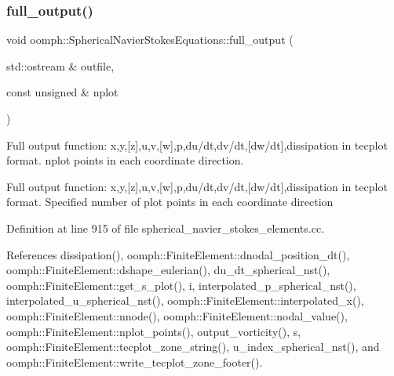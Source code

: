 \mbox{\label{classoomph_1_1SphericalNavierStokesEquations_a444d7347a79629db8e59c1267b97f201}} 
\subsubsection{\texorpdfstring{full\+\_\+output()}{full\_output()}\hspace{0.1cm}{\footnotesize\ttfamily [2/2]}}
{\footnotesize\ttfamily void oomph\+::\+Spherical\+Navier\+Stokes\+Equations\+::full\+\_\+output (\begin{DoxyParamCaption}\item[{std\+::ostream \&}]{outfile,  }\item[{const unsigned \&}]{nplot }\end{DoxyParamCaption})}



Full output function\+: x,y,\mbox{[}z\mbox{]},u,v,\mbox{[}w\mbox{]},p,du/dt,dv/dt,\mbox{[}dw/dt\mbox{]},dissipation in tecplot format. nplot points in each coordinate direction. 

Full output function\+: x,y,\mbox{[}z\mbox{]},u,v,\mbox{[}w\mbox{]},p,du/dt,dv/dt,\mbox{[}dw/dt\mbox{]},dissipation in tecplot format. Specified number of plot points in each coordinate direction 

Definition at line 915 of file spherical\+\_\+navier\+\_\+stokes\+\_\+elements.\+cc.



References dissipation(), oomph\+::\+Finite\+Element\+::dnodal\+\_\+position\+\_\+dt(), oomph\+::\+Finite\+Element\+::dshape\+\_\+eulerian(), du\+\_\+dt\+\_\+spherical\+\_\+nst(), oomph\+::\+Finite\+Element\+::get\+\_\+s\+\_\+plot(), i, interpolated\+\_\+p\+\_\+spherical\+\_\+nst(), interpolated\+\_\+u\+\_\+spherical\+\_\+nst(), oomph\+::\+Finite\+Element\+::interpolated\+\_\+x(), oomph\+::\+Finite\+Element\+::nnode(), oomph\+::\+Finite\+Element\+::nodal\+\_\+value(), oomph\+::\+Finite\+Element\+::nplot\+\_\+points(), output\+\_\+vorticity(), s, oomph\+::\+Finite\+Element\+::tecplot\+\_\+zone\+\_\+string(), u\+\_\+index\+\_\+spherical\+\_\+nst(), and oomph\+::\+Finite\+Element\+::write\+\_\+tecplot\+\_\+zone\+\_\+footer().

